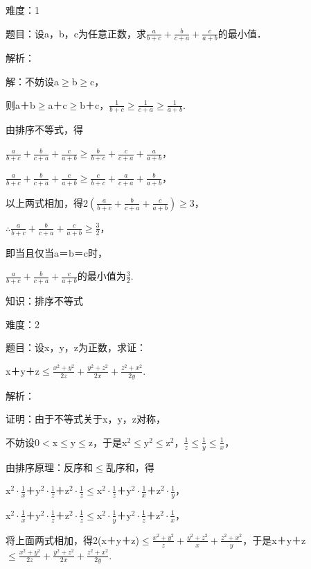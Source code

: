 \documentclass{article} %
\begin{document}
 难度：1

 题目：设a，b，c为任意正数，求$\frac{a}{b+c}+\frac{b}{c+a}+\frac{c}{a+b}$的最小值．

 解析：

 解：不妨设a$\mathrm{\ge}$b$\mathrm{\ge}$c，

则a＋b$\mathrm{\ge}$a＋c$\mathrm{\ge}$b＋c，$\frac{1}{b+c}\mathrm{\ge}\frac{1}{c+a}\mathrm{\ge}\frac{1}{a+b}$.

由排序不等式，得

$\frac{a}{b+c}+\frac{b}{c+a}+\frac{c}{a+b}\mathrm{\ge}\frac{b}{b+c}+\frac{c}{c+a}+\frac{a}{a+b}$，

$\frac{a}{b+c}+\frac{b}{c+a}+\frac{c}{a+b}\mathrm{\ge}\frac{c}{b+c}+\frac{a}{c+a}+\frac{b}{a+b}$，

以上两式相加，得2$(\frac{a}{b+c}+\frac{b}{c+a}+\frac{c}{a+b})\mathrm{\ge}$3，

$\mathrm{\therefore}\frac{a}{b+c}+\frac{b}{c+a}+\frac{c}{a+b}\mathrm{\ge}\frac{3}{2}$，

即当且仅当a＝b＝c时，

$\frac{a}{b+c}+\frac{b}{c+a}+\frac{c}{a+b}$的最小值为$\frac{3}{2}$.

 知识：排序不等式

 难度：2

 题目：设x，y，z为正数，求证：

x＋y＋z$\mathrm{\le}\frac{x^2+y^2}{2z}+\frac{y^2+z^2}{2x}+\frac{z^2+x^2}{2y}$.

 解析：

 证明：由于不等式关于x，y，z对称，

不妨设0$\mathrm{<}$x$\mathrm{\le}$y$\mathrm{\le}$z，于是x${}^{2}$$\mathrm{\le}$y${}^{2}$$\mathrm{\le}$z${}^{2}$，$\frac{1}{z}\mathrm{\le}\frac{1}{y}\mathrm{\le}\frac{1}{x}$，

由排序原理：反序和$\mathrm{\le}$乱序和，得

x${}^{2}\cdot\frac{1}{x}$＋y${}^{2}\cdot\frac{1}{z}$＋z${}^{2}\cdot\frac{1}{z}\mathrm{\le}$x${}^{2}\cdot\frac{1}{z}$＋y${}^{2}\cdot\frac{1}{x}$＋z${}^{2}\cdot\frac{1}{y}$，

x${}^{2}\cdot\frac{1}{x}$＋y${}^{2}\cdot\frac{1}{z}$＋z${}^{2}\cdot\frac{1}{z}\mathrm{\le}$x${}^{2}\cdot\frac{1}{y}$＋y${}^{2}\cdot\frac{1}{z}$＋z${}^{2}\cdot\frac{1}{x}$，

将上面两式相加，得2(x＋y＋z)$\mathrm{\le}\frac{x^2+y^2}{z}+\frac{y^2+z^2}{x}+\frac{z^2+x^2}{y}$，于是x＋y＋z$\mathrm{\le}\frac{x^2+y^2}{2z}+\frac{y^2+z^2}{2x}+\frac{z^2+x^2}{2y}$.
\end{document}
